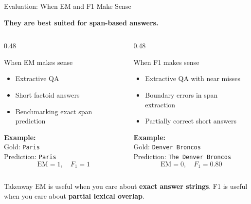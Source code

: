 \documentclass[aspectratio=169, xcolor=table]{beamer}
\newif\ifanimated
\newcommand{\cpause}{\ifanimated\pause\fi}
\begin{document}
\begin{frame}[shrink=10]{Evaluation: When EM and F1 Make Sense}
\cpause
\textbf{They are best suited for span-based answers.}

\vspace{0.6em}
\begin{columns}[T]
\begin{column}{0.48\textwidth}
\begin{block}{When EM makes sense}
\begin{itemize}
  \item Extractive QA
  \item Short factoid answers
  \item Benchmarking exact span prediction
\end{itemize}

\vspace{0.3em}
\textbf{Example:}\\
Gold: \texttt{Paris}\\
Prediction: \texttt{Paris}\\
\[
\mathrm{EM}=1,\quad F_1=1
\]
\end{block}
\end{column}

\begin{column}{0.48\textwidth}
\begin{block}{When F1 makes sense}
\begin{itemize}
  \item Extractive QA with near misses
  \item Boundary errors in span extraction
  \item Partially correct short answers
\end{itemize}

\vspace{0.3em}
\textbf{Example:}\\
Gold: \texttt{Denver Broncos}\\
Prediction: \texttt{The Denver Broncos}\\
\[
\mathrm{EM}=0,\quad F_1=0.80
\]
\end{block}
\end{column}
\end{columns}

\vspace{0.6em}
\begin{block}{Takeaway}
EM is useful when you care about \textbf{exact answer strings}.  
F1 is useful when you care about \textbf{partial lexical overlap}.
\end{block}
\end{frame}
\end{document}
